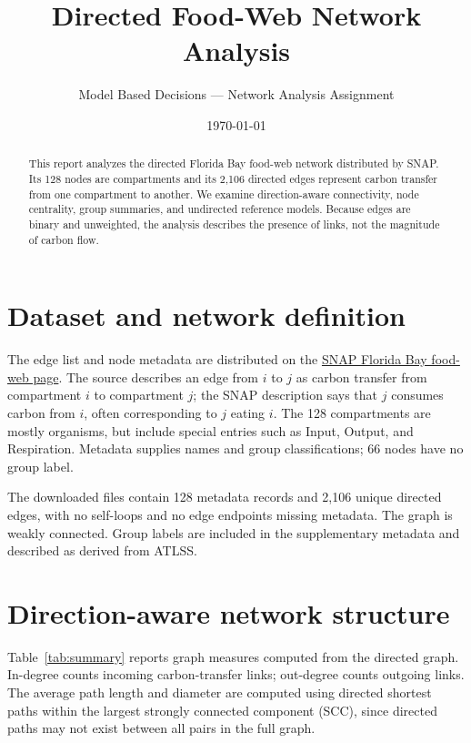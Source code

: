 \documentclass[11pt]{article}
\title{Directed Food-Web Network Analysis}
\author{Model Based Decisions --- Network Analysis Assignment}
\date{\today}
\begin{document}
\maketitle

\begin{abstract}
This report analyzes the directed Florida Bay food-web network distributed by SNAP. Its 128 nodes are compartments and its 2,106 directed edges represent carbon transfer from one compartment to another. We examine direction-aware connectivity, node centrality, group summaries, and undirected reference models. Because edges are binary and unweighted, the analysis describes the presence of links, not the magnitude of carbon flow.
\end{abstract}

\section{Dataset and network definition}

The edge list and node metadata are distributed on the \href{https://snap.stanford.edu/data/Florida-bay.html}{SNAP Florida Bay food-web page}. The source describes an edge from $i$ to $j$ as carbon transfer from compartment $i$ to compartment $j$; the SNAP description says that $j$ consumes carbon from $i$, often corresponding to $j$ eating $i$. The 128 compartments are mostly organisms, but include special entries such as Input, Output, and Respiration. Metadata supplies names and group classifications; 66 nodes have no group label.

The downloaded files contain 128 metadata records and 2,106 unique directed edges, with no self-loops and no edge endpoints missing metadata. The graph is weakly connected. Group labels are included in the supplementary metadata and described as derived from ATLSS.

\section{Direction-aware network structure}

Table~\ref{tab:summary} reports graph measures computed from the directed graph. In-degree counts incoming carbon-transfer links; out-degree counts outgoing links. The average path length and diameter are computed using directed shortest paths within the largest strongly connected component (SCC), since directed paths may not exist between all pairs in the full graph.
\end{document}
